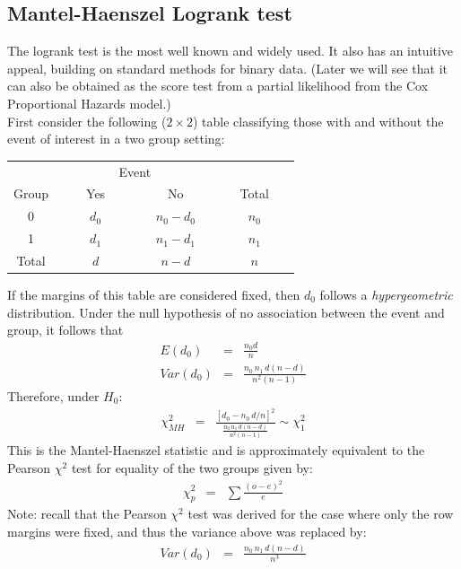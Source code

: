 \documentclass[11pt,slidesonly,semrot,portrait,palatino]{book}
\begin{document}
\subsection{Mantel-Haenszel Logrank test}
The logrank test is the most well known and
widely used.  It also has an intuitive appeal, building on standard
methods for binary data.  (Later we will see that it
can also be obtained as the score test from a partial
likelihood from the Cox Proportional Hazards model.)
\\[2ex]
First consider the following ($2 \times 2$) table classifying those
with and without the event of interest in a two group setting:
\begin{center}
\begin{tabular}{cccc}
\hline \hline
& \multicolumn{2}{c}{Event} & \\ \cline{2-3}
\multicolumn{1}{c}{Group } & ~~~~Yes~~~~ & ~~~~No~~~~ & ~~~Total~~~\\ \hline
0 & $d_0$ & $n_0 - d_0$ & $n_0$  \\
1 & $d_1$ & $n_1 - d_1$ & $n_1$ \\
\hline
Total &  $d  $ & $n   - d  $ & $n  $  \\ \hline \hline
\end{tabular}
\end{center}
If the margins of this table are considered fixed, then $d_0$
follows a {\em hypergeometric} distribution.  Under the null hypothesis of no association between
the event and group, it follows that
\begin{eqnarray*}
E(d_0) & = & \frac{n_0 d}{n}\\[2ex]
Var(d_0) & = & \frac{n_0 \, n_1 \, d(n-d)}{n^2 (n-1)}
\end{eqnarray*}
Therefore, under $H_0$:\\
\begin{eqnarray*}
\chi^2_{MH} & = & \frac{\left[d_0-n_0 \, d/n\right]^2}{\frac{n_0 \, n_1 \, d(n-d)}
{n^2 (n-1)}} \sim \chi^2_1
\end{eqnarray*}
This is the Mantel-Haenszel statistic and is approximately
equivalent to the Pearson $\chi^2$ test for equality of the two
groups given by:
\begin{eqnarray*}
\chi^2_p & = & \sum \frac{(o-e)^2}{e}
\end{eqnarray*}
Note:  recall that the Pearson $\chi^2$ test was derived for the case where
only the row margins were fixed, and thus the variance above was replaced by:
\begin{eqnarray*}
Var(d_0) & = & \frac{n_0 \, n_1 \, d(n-d)}{n^3}
\end{eqnarray*}
\end{document}
